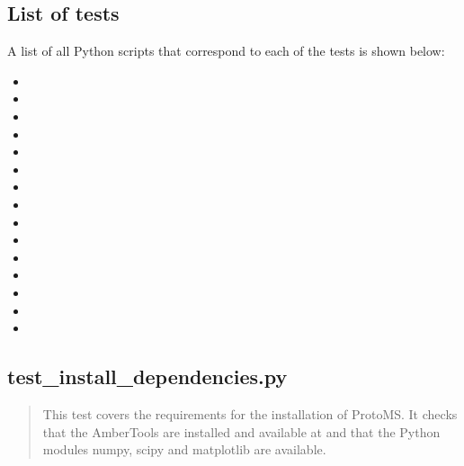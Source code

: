 \documentclass[letterpaper,10pt,english]{sphinxmanual}
\begin{document}
\subsection{List of tests}
\label{\detokenize{testsuite:list-of-tests}}
A list of all Python scripts that correspond to each of the tests is shown below:
\begin{itemize}
\item {} 

\item {} 

\item {} 

\item {} 

\item {} 

\item {} 

\item {} 

\item {} 

\item {} 

\item {} 

\item {} 

\item {} 

\item {} 

\item {} 

\item {} 

\end{itemize}


\subsection{test\_install\_dependencies.py}
\label{\detokenize{testsuite:test-install-dependencies-py}}
\begin{quote}

This test covers the requirements for the installation of ProtoMS.  It checks that the AmberTools are installed and available at  and that the Python modules numpy, scipy and matplotlib are available.
\end{quote}
\end{document}
